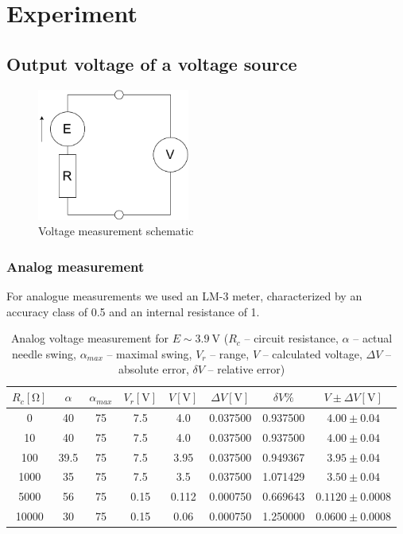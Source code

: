 \section{Experiment}

\subsection{Output voltage of a voltage source}

\begin{figure}[H]
	\centering
	\includegraphics[width=5cm]{schematics/analog_voltage.pdf}
	\caption{Voltage measurement schematic}
	\label{fig:voltage_schematics}
\end{figure}

\subsubsection*{Analog measurement}

For analogue measurements we used an LM-3 meter, characterized by an accuracy class of 0.5 and an internal resistance of \SI{1}{\frac{\kilo\ohm}{\volt}}.

\begin{table}[H]
	\centering
	\begin{tabular}{ c | c | c | c | c | c | c | c}
		$R_c [\unit{\ohm}]$ & $\alpha$ & $\alpha_{max}$  & $V_r [\unit{\volt}]$ & $V [\unit{\volt}]$ & $\Delta V [\unit{\volt}]$ & $\delta V  \unit{\percent}$ & $V \pm \Delta V [\unit{\volt}]$\\
		\hline
		0 & 40 & 75 & 7.5 & 4.0 & 0.037500 & 0.937500 & $4.00 \pm 0.04$\\
		\hline
		10 & 40 & 75 & 7.5 & 4.0 & 0.037500 & 0.937500 & $4.00 \pm 0.04$\\
		\hline
		100 & 39.5 & 75 & 7.5 & 3.95 & 0.037500 & 0.949367 & $3.95 \pm 0.04$\\
		\hline
		1000 & 35 & 75 & 7.5 & 3.5 & 0.037500 & 1.071429 & $3.50 \pm 0.04$\\
		\hline
		5000 & 56 & 75 & 0.15 & 0.112 & 0.000750 & 0.669643 & $0.1120 \pm 0.0008$\\
		\hline
		10000 & 30 & 75 & 0.15 & 0.06 & 0.000750 & 1.250000 & $0.0600 \pm 0.0008$
	\end{tabular}
	\caption{Analog voltage measurement for $E \sim \SI{3.9}{\volt}$ ($R_c$ -- circuit resistance, $\alpha$ -- actual needle swing, $\alpha_{max}$ -- maximal swing, $V_r$ -- range, $V$ -- calculated voltage, $\Delta V$ -- absolute error, $\delta V$ -- relative error)}
	\label{tab:analog_volt_1}
\end{table}

